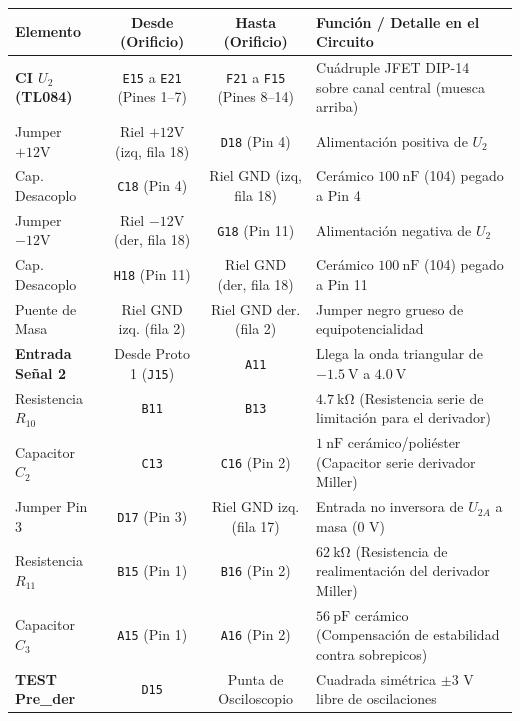 \documentclass[10pt, a4paper]{article}
\begin{document}
\begin{center}
\small
\renewcommand{\arraystretch}{1.08}
\begin{tabularx}{\textwidth}{l c c X}
\toprule
\textbf{Elemento} & \textbf{Desde (Orificio)} & \textbf{Hasta (Orificio)} & \textbf{Función / Detalle en el Circuito} \\
\midrule
\rowcolor{softgray} \textbf{CI $U_2$ (TL084)} & \texttt{E15} a \texttt{E21} (Pines 1--7) & \texttt{F21} a \texttt{F15} (Pines 8--14) & Cuádruple JFET DIP-14 sobre canal central (muesca arriba) \\
Jumper $+12\text{V}$ & Riel $+12\text{V}$ (izq, fila 18) & \texttt{D18} (Pin 4) & Alimentación positiva de $U_2$ \\
\rowcolor{softgray} Cap. Desacoplo & \texttt{C18} (Pin 4) & Riel GND (izq, fila 18) & Cerámico $\SI{100}{\nano\farad}$ (104) pegado a Pin 4 \\
Jumper $-12\text{V}$ & Riel $-12\text{V}$ (der, fila 18) & \texttt{G18} (Pin 11) & Alimentación negativa de $U_2$ \\
\rowcolor{softgray} Cap. Desacoplo & \texttt{H18} (Pin 11) & Riel GND (der, fila 18) & Cerámico $\SI{100}{\nano\farad}$ (104) pegado a Pin 11 \\
Puente de Masa & Riel GND izq. (fila 2) & Riel GND der. (fila 2) & Jumper negro grueso de equipotencialidad \\
\midrule
\textbf{Entrada Señal 2} & Desde Proto 1 (\texttt{J15}) & \texttt{A11} & Llega la onda triangular de $\SI{-1.5}{\volt}$ a $\SI{+4.0}{\volt}$ \\
\rowcolor{softgray} Resistencia $R_{10}$ & \texttt{B11} & \texttt{B13} & $\SI{4.7}{\kilo\ohm}$ (Resistencia serie de limitación para el derivador) \\
Capacitor $C_2$ & \texttt{C13} & \texttt{C16} (Pin 2) & $\SI{1}{\nano\farad}$ cerámico/poliéster (Capacitor serie derivador Miller) \\
\rowcolor{softgray} Jumper Pin 3 & \texttt{D17} (Pin 3) & Riel GND izq. (fila 17) & Entrada no inversora de $U_{2A}$ a masa ($0\text{ V}$) \\
Resistencia $R_{11}$ & \texttt{B15} (Pin 1) & \texttt{B16} (Pin 2) & $\SI{62}{\kilo\ohm}$ (Resistencia de realimentación del derivador Miller) \\
\rowcolor{softgray} Capacitor $C_3$ & \texttt{A15} (Pin 1) & \texttt{A16} (Pin 2) & $\SI{56}{\pico\farad}$ cerámico (Compensación de estabilidad contra sobrepicos) \\
\textbf{TEST Pre\_der} & \texttt{D15} & Punta de Osciloscopio & Cuadrada simétrica $\pm 3\text{ V}$ libre de oscilaciones \\

\end{tabularx}
\end{center}
\end{document}
